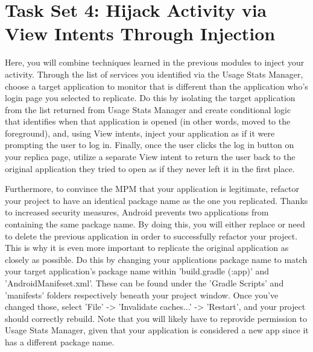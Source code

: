 \documentclass[letterpaper,12pt]{report}
\begin{document}

\section*{Task Set 4: Hijack Activity via View Intents Through Injection}\label{sec:Task 4: Hijack Activity Via View Intents Through Injection}

Here, you will combine techniques learned in the previous modules to inject your activity. Through the list of services you identified via the Usage Stats Manager, choose a target application to monitor that is different than the application who's login page you selected to replicate. Do this by isolating the target application from the list returned from Usage Stats Manager and create conditional logic that identifies when that application is opened (in other words, moved to the foreground), and, using View intents, inject your application as if it were prompting the user to log in. Finally, once the user clicks the log in button on your replica page, utilize a separate View intent to return the user back to the original application they tried to open as if they never left it in the first place.

\bigskip

Furthermore, to convince the MPM that your application is legitimate, refactor your project to have an identical package name as the one you replicated. Thanks to increased security measures, Android prevents two applications from containing the same package name. By doing this, you will either replace or need to delete the previous application in order to successfully refactor your project. This is why it is even more important to replicate the original application as closely as possible. Do this by changing your applications package name to match your target application's package name within 'build.gradle (:app)' and 'AndroidManifeset.xml'. These can be found under the 'Gradle Scripts' and 'manifests' folders respectively beneath your project window. Once you've changed those, select 'File' -> 'Invalidate caches...' -> 'Restart', and your project should correctly rebuild. Note that you will likely have to reprovide permission to Usage Stats Manager, given that your application is considered a new app since it has a different package name.

\bigskip
\end{document}
